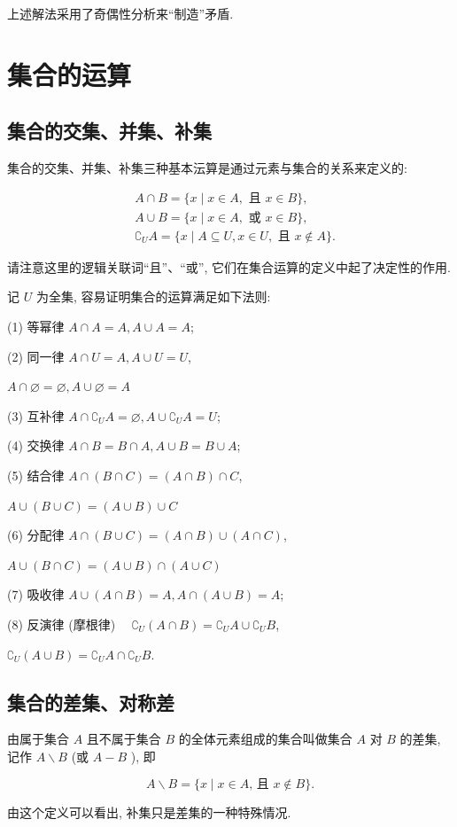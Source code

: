 \begin{note}
	上述解法采用了奇偶性分析来“制造”矛盾.
\end{note}

\section{集合的运算}

\subsection{集合的交集、并集、补集}
集合的交集、并集、补集三种基本沄算是通过元素与集合的关系来定义的:

$$
	\begin{aligned}
		 & A \cap B=\{x \mid x \in A, \text { 且 } x \in B\},                             \\
		 & A \cup B=\{x \mid x \in A, \text { 或 } x \in B\},                             \\
		 & \complement_{U} A=\{x \mid A \subseteq U, x \in U, \text { 且 } x \notin A\} .
	\end{aligned}
$$

请注意这里的逻辑关联词“且”、“或”, 它们在集合运算的定义中起了决定性的作用.

记 $U$ 为全集, 容易证明集合的运算满足如下法则:

(1) 等幂律 $A \cap A=A, A \cup A=A$;

(2) 同一律 $A \cap U=A, A \cup U=U$,

$A \cap \varnothing=\varnothing, A \cup \varnothing=A$

(3) 互补律 $A \cap \complement_{U} A=\varnothing, A \cup \complement_{U} A=U$;

(4) 交换律 $A \cap B=B \cap A, A \cup B=B \cup A$;

(5) 结合律 $A \cap(B \cap C)=(A \cap B) \cap C$,

$A \cup(B \cup C)=(A \cup B) \cup C$

(6) 分配律 $A \cap(B \cup C)=(A \cap B) \cup(A \cap C)$,

$A \cup(B \cap C)=(A \cup B) \cap(A \cup C)$

(7) 吸收律 $A \cup(A \cap B)=A, A \cap(A \cup B)=A$;

(8) 反演律 (摩根律) $\quad \complement_{U}(A \cap B)=\complement_{U} A \cup \complement_{U} B$,

$\complement_{U}(A \cup B)=\complement_{U} A \cap \complement_{U} B$.

\subsection{集合的差集、对称差}
\begin{definition}
	由属于集合 $A$ 且不属于集合 $B$ 的全体元素组成的集合叫做集合 $A$ 对 $B$ 的差集, 记作 $A \backslash B$ (或 $A-B$ ), 即

	$$
		A \backslash B=\{x \mid x \in A \text {, 且 } x \notin B\} .
	$$
\end{definition}
由这个定义可以看出, 补集只是差集的一种特殊情况.

